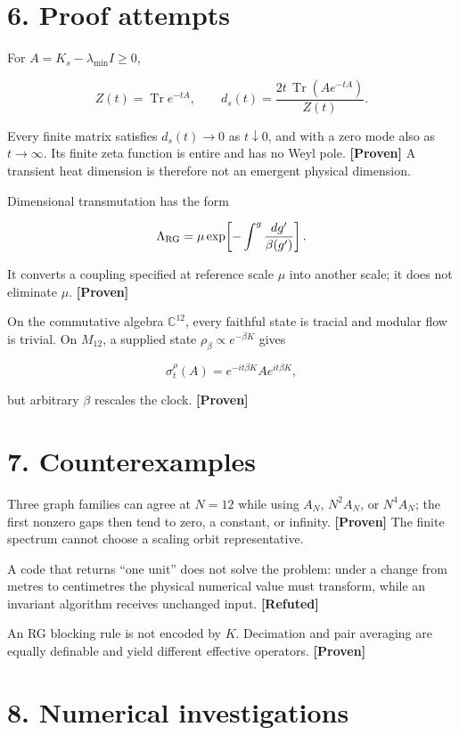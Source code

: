 \documentclass[11pt,a4paper,openany]{report}
\newcommand{\statusProven}{\textcolor{fingreen}{[Proven]}}
\newcommand{\statusRefuted}{\textcolor{finred}{[Refuted]}}
\begin{document}
\section{6. Proof attempts}

For \(A=K_s-\lambda_{\min}I\ge0\),

\[
Z(t)=\operatorname{Tr}e^{-tA},\qquad
d_s(t)=\frac{2t\,\operatorname{Tr}(Ae^{-tA})}{Z(t)}.
\]

Every finite matrix satisfies \(d_s(t)\to0\) as \(t\downarrow0\), and with a zero mode also as \(t\to\infty\). Its finite zeta function is entire and has no Weyl pole. \textbf{\statusProven{}} A transient heat dimension is therefore not an emergent physical dimension.

Dimensional transmutation has the form

\[
\Lambda_{\rm RG}=\mu
\exp\!\left[-\int^g\frac{dg'}{\beta(g')}\right].
\]

It converts a coupling specified at reference scale \(\mu\) into another scale; it does not eliminate \(\mu\). \textbf{\statusProven{}}

On the commutative algebra \(\mathbb C^{12}\), every faithful state is tracial and modular flow is trivial. On \(M_{12}\), a supplied state \(\rho_\beta\propto e^{-\beta K}\) gives

\[
\sigma_t^\rho(A)=e^{-it\beta K}Ae^{it\beta K},
\]

but arbitrary \(\beta\) rescales the clock. \textbf{\statusProven{}}

\section{7. Counterexamples}

Three graph families can agree at \(N=12\) while using \(A_N\), \(N^2A_N\), or \(N^4A_N\); the first nonzero gaps then tend to zero, a constant, or infinity. \textbf{\statusProven{}} The finite spectrum cannot choose a scaling orbit representative.

A code that returns “one unit” does not solve the problem: under a change from metres to centimetres the physical numerical value must transform, while an invariant algorithm receives unchanged input. \textbf{\statusRefuted{}}

An RG blocking rule is not encoded by \(K\). Decimation and pair averaging are equally definable and yield different effective operators. \textbf{\statusProven{}}

\section{8. Numerical investigations}
\end{document}
